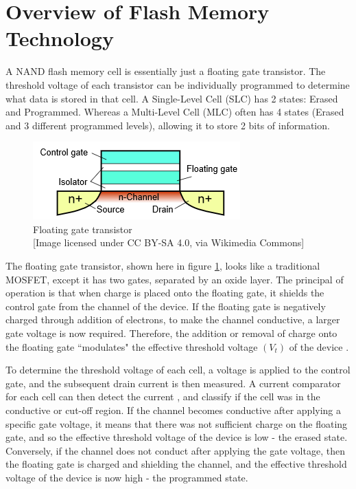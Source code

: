 \documentclass[11pt]{article}
\numberwithin{equation}{subsection}
\begin{document}
\section{Overview of Flash Memory Technology} \label{section:memtech}
A NAND flash memory cell is essentially just a floating gate transistor. The threshold voltage of each transistor can be individually programmed to determine what data is stored in that cell. A Single-Level Cell (SLC) has 2 states: Erased and Programmed. Whereas a Multi-Level Cell (MLC) often has 4 states (Erased and 3 different programmed levels), allowing it to store 2 bits of information.
\begin{figure}[h]
\centering
\includegraphics[scale=0.65]{floating_gate_transistor}
\caption[]{Floating gate transistor\\ \footnotesize[Image licensed under CC BY-SA 4.0, via Wikimedia Commons]}
\label{figure:floating_gate}
\end{figure}

The floating gate transistor, shown here in figure \ref{figure:floating_gate}, looks like a traditional MOSFET, except it has two gates, separated by an oxide layer. The principal of operation is that when charge is placed onto the floating gate, it shields the control gate from the channel of the device. If the floating gate is negatively charged through addition of electrons, to make the channel conductive, a larger gate voltage is now required. Therefore, the addition or removal of charge onto the floating gate ``modulates" the effective threshold voltage $(V_t)$ of the device \cite{bez2003introduction}.

To determine the threshold voltage of each cell, a voltage is applied to the control gate, and the subsequent drain current is then measured. A current comparator for each cell can then detect the current \cite{DBLP:journals/corr/abs-1210-0149}, and classify if the cell was in the conductive or cut-off region. If the channel becomes conductive after applying a specific gate voltage, it means that there was not sufficient charge on the floating gate, and so the effective threshold voltage of the device is low - the erased state. Conversely, if the channel does not conduct after applying the gate voltage, then the floating gate is charged and shielding the channel, and the effective threshold voltage of the device is now high - the programmed state.
\end{document}
